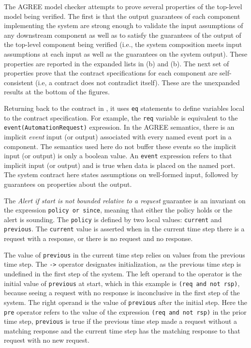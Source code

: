 The AGREE model checker attempts to prove several properties of the top-level model being verified. The first is that the output guarantees of each component implementing the system are strong enough to validate the input assumptions of any downstream component as well as to satisfy the guarantees of the output of the top-level component being verified (i.e., the system composition meets input assumptions at each input as well as the guarantees on the system output). These properties are reported in the expanded lists in (b) and (b).  The next set of properties prove that the contract specifications for each component are self-consistent (i.e, a contract does not contradict itself). These are the unexpanded results at the bottom of the figures.

Returning back to the contract in , it uses \texttt{eq} statements to define variables local to the contract specification. For example, the \texttt{req} variable is equivalent to the \texttt{event(AutomationRequest)} expression. In the AGREE semantics, there is an implicit \emph{event} input (or output) associated with every named event port in a component. The semantics used here do not buffer these events so the implicit input (or output) is only a boolean value. An \texttt{event} expression refers to that implicit input (or output) and is true when data is placed on the named port. The system contract here states assumptions on well-formed input, followed by guarantees on properties about the output.

The \emph{Alert if start is not bounded relative to a request} guarantee is an invariant on the expression \texttt{policy or since}, meaning that either the policy holds or the alert is sounding. The \texttt{policy} is defined by two local values: \texttt{current} and \texttt{previous}. The \texttt{current} value is asserted when in the current time step there is a request with a response, or there is no request and no response.

The value of \texttt{previous} in the current time step relies on values from the previous time step. The \texttt{->} operator designates initialization, as the previous time step is undefined in the first step of the system. The left operand to the operator is the initial value of \texttt{previous} at start, which in this example is \texttt{(req and not rsp)}, because seeing a request with no response is inconclusive in the first step of the system. The right operand is the value of \texttt{previous} after the initial step. Here the \texttt{pre} operator refers to the value of the expression \texttt{(req and not rsp)} in the prior time step, \texttt{previous} is true if the previous time step made a request without a matching response and the current time step has the matching response to that request with no new request.

